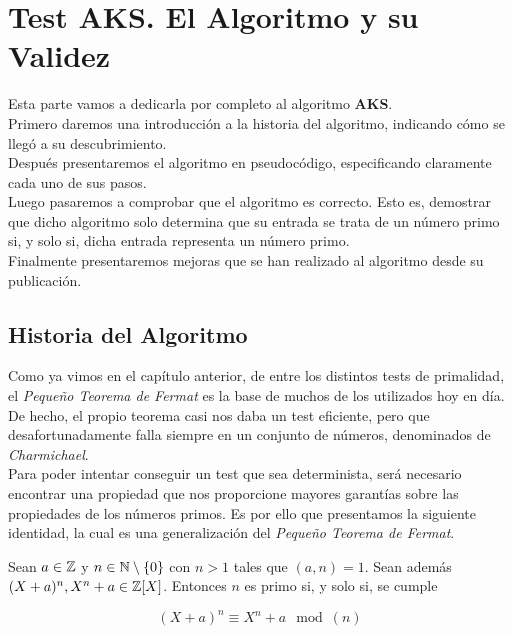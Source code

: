 \chapter{Test AKS. El Algoritmo y su Validez}

Esta parte vamos a dedicarla por completo al algoritmo \textbf{AKS}.\\

Primero daremos una introducción a la historia del algoritmo, indicando cómo se llegó a su descubrimiento.\\

Después presentaremos el algoritmo en pseudocódigo, especificando claramente cada uno de sus pasos.\\

Luego pasaremos a comprobar que el algoritmo es correcto. Esto es, demostrar que dicho algoritmo solo determina que su entrada se trata de un número primo si, y solo si, dicha entrada representa un número primo.\\

Finalmente presentaremos mejoras que se han realizado al algoritmo desde su publicación.

\section{Historia del Algoritmo}

Como ya vimos en el capítulo anterior, de entre los distintos tests de primalidad, el \textit{Pequeño Teorema de Fermat} es la base de muchos de los utilizados hoy en día. De hecho, el propio teorema casi nos daba un test eficiente, pero que desafortunadamente falla siempre en un conjunto de números, denominados de \textit{Charmichael}.\\

Para poder intentar conseguir un test que sea determinista, será necesario encontrar una propiedad que nos proporcione mayores garantías sobre las propiedades de los números primos. Es por ello que presentamos la siguiente identidad, la cual es una generalización del \textit{Pequeño Teorema de Fermat}.

\begin{proposicion}\label{lema_identidad_de_congruencias}
	Sean $a \in \mathbb{Z}$ y $n \in \mathbb{N} \setminus \{0\}$ con $n > 1$ tales que $(a, n) = 1$. Sean además $(X + a)^n, X^n + a \in \mathbb{Z}[X]$. Entonces $n$ es primo si, y solo si, se cumple
	
	\begin{equation}\label{identidad_original}
	(X + a)^n \equiv X^n + a \mod(n)
	\end{equation}
\end{proposicion}

